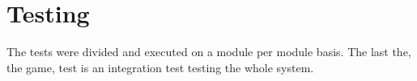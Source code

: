 \section{Testing}

The tests were divided and executed on a module per module basis. The last the, the game, test is
an integration test testing the whole system.
